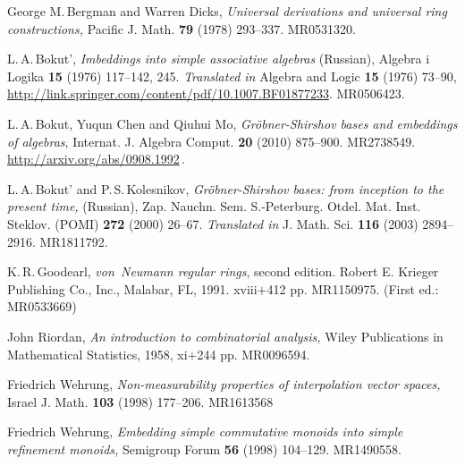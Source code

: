 \documentclass{amsart}
\begin{document}
\begin{thebibliography}{00}
 George M.\,Bergman and Warren Dicks,
{\em Universal derivations and universal ring constructions,}
Pacific J. Math. {\bf 79} (1978) 293--337.
MR0531320.

 L.\,A.\,Bokut',
{\em Imbeddings into simple associative algebras} (Russian),
Algebra i Logika {\bf 15} (1976) 117--142, 245.
{\em Translated in}
Algebra and Logic {\bf 15} (1976) 73--90, 
\url{http://link.springer.com/content/pdf/10.1007.BF01877233}.
MR0506423.

 L.\,A.\,Bokut, Yuqun Chen and Qiuhui Mo,
{\em Gr\"{o}bner-Shirshov bases and embeddings of algebras},
Internat. J. Algebra Comput. {\bf 20} (2010) 875--900.
MR2738549.
\url{http://arxiv.org/abs/0908.1992}\,.

 L.\,A.\,Bokut' and P.\,S.\,Kolesnikov,
{\em Gr\"{o}bner-Shirshov bases: from inception to the present time,}
(Russian),
Zap. Nauchn. Sem. S.-Peterburg. Otdel. Mat. Inst. Steklov.
(POMI) {\bf 272} (2000) 26--67.
{\em Translated in} J. Math. Sci. {\bf 116} (2003) 2894--2916.
MR1811792.

 K.\,R.\,Goodearl,
{\em von~Neumann regular rings}, second edition. Robert E. Krieger
Publishing Co., Inc., Malabar, FL, 1991. xviii$+$412 pp.
MR1150975.  (First ed.: MR0533669)

 John Riordan,
{\em An introduction to combinatorial analysis,}
Wiley Publications in Mathematical Statistics, 1958, xi+244 pp.
MR0096594.

 Friedrich Wehrung,
{\em Non-measurability properties of interpolation vector spaces,}
Israel J. Math. {\bf 103} (1998) 177--206.
MR1613568

 Friedrich Wehrung,
{\em Embedding simple commutative monoids into simple refinement
monoids,} Semigroup Forum {\bf 56} (1998) 104--129.
MR1490558.

\end{thebibliography}
\end{document}
